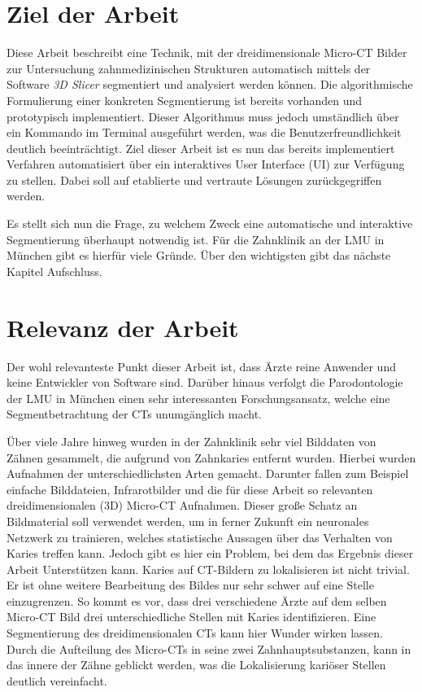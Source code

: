 \section{Ziel der Arbeit}
\label{sec:ziel_der_arbeit} Diese Arbeit beschreibt eine Technik, mit der
dreidimensionale Micro-CT Bilder zur Untersuchung zahnmedizinischen Strukturen
automatisch mittels der Software \textit{3D Slicer} segmentiert und analysiert werden
können. Die algorithmische Formulierung einer konkreten Segmentierung ist
bereits vorhanden und prototypisch implementiert. Dieser Algorithmus muss jedoch
umständlich über ein Kommando im Terminal ausgeführt werden, was die
Benutzerfreundlichkeit deutlich beeinträchtigt. Ziel dieser Arbeit ist es nun das
bereits implementiert Verfahren automatisiert über ein interaktives User Interface
(UI) zur Verfügung zu stellen. Dabei soll auf etablierte und vertraute Lösungen
zurückgegriffen werden.

Es stellt sich nun die Frage, zu welchem Zweck eine automatische und interaktive
Segmentierung überhaupt notwendig ist. Für die Zahnklinik an der LMU in München
gibt es hierfür viele Gründe. Über den wichtigsten gibt das nächste Kapitel Aufschluss.

\section{Relevanz der Arbeit}
\label{sec:relevanz_der_arbeit} Der wohl relevanteste Punkt dieser Arbeit ist,
dass Ärzte reine Anwender und keine Entwickler von Software sind. Darüber hinaus
verfolgt die Parodontologie der LMU in München einen sehr interessanten Forschungsansatz,
welche eine Segmentbetrachtung der CTs unumgänglich macht.

Über viele Jahre hinweg wurden in der Zahnklinik sehr viel Bilddaten von Zähnen
gesammelt, die aufgrund von Zahnkaries entfernt wurden. Hierbei wurden Aufnahmen
der unterschiedlichsten Arten gemacht. Darunter fallen zum Beispiel einfache Bilddateien,
Infrarotbilder und die für diese Arbeit so relevanten dreidimensionalen (3D)
Micro-CT Aufnahmen. Dieser große Schatz an Bildmaterial soll verwendet werden,
um in ferner Zukunft ein neuronales Netzwerk zu trainieren, welches statistische
Aussagen über das Verhalten von Karies treffen kann. Jedoch gibt es hier ein
Problem, bei dem das Ergebnis dieser Arbeit Unterstützen kann. Karies auf CT-Bildern
zu lokalisieren ist nicht trivial. Er ist ohne weitere Bearbeitung des Bildes nur
sehr schwer auf eine Stelle einzugrenzen. So kommt es vor, dass drei verschiedene
Ärzte auf dem selben Micro-CT Bild drei unterschiedliche Stellen mit Karies identifizieren.
Eine Segmentierung des dreidimensionalen CTs kann hier Wunder wirken lassen. Durch
die Aufteilung des Micro-CTs in seine zwei Zahnhauptsubstanzen, kann in das
innere der Zähne geblickt werden, was die Lokalisierung kariöser Stellen deutlich
vereinfacht.

